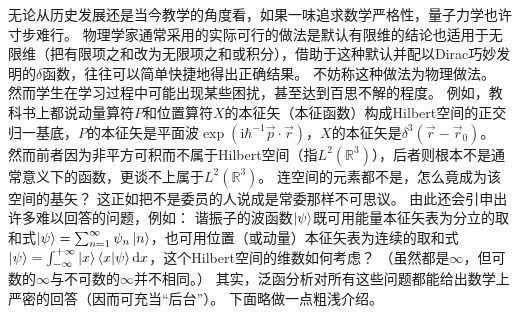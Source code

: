 无论从历史发展还是当今教学的角度看，如果一味追求数学严格性，量子力学也许寸步难行。
物理学家通常采用的实际可行的做法是默认有限维的结论也适用于无限维（把有限项之和改为无限项之和或积分），借助于这种默认并配以Dirac巧妙发明的$\delta$函数，往往可以简单快捷地得出正确结果。
不妨称这种做法为物理做法。
然而学生在学习过程中可能出现某些困扰，甚至达到百思不解的程度。
例如，教科书上都说动量算符$P$和位置算符$X$的本征矢（本征函数）构成Hilbert空间的正交归一基底，$P$的本征矢是平面波$\exp(\mathrm{i}\hbar^{-1}\vec p \cdot \vec r)$，$X$的本征矢是$\delta^3(\vec r - \vec r_0)$。
然而前者因为非平方可积而不属于Hilbert空间（指$L^2(\mathbb{R}^3)$），后者则根本不是通常意义下的函数，更谈不上属于$L^2(\mathbb{R}^3)$。
连空间的元素都不是，怎么竟成为该空间的基矢？
这正如把不是委员的人说成是常委那样不可思议。
由此还会引申出许多难以回答的问题，例如：
谐振子的波函数$\ket{\psi}$既可用能量本征矢表为分立的取和式$\ket{\psi} = \sum^\infty_{n = 1}\psi_n\ket{n}$，也可用位置（或动量）本征矢表为连续的取和式$\ket{\psi} = \int^{+\infty}_{-\infty}\ket{x}\braket{x|\psi}\mathrm{d}x$，这个Hilbert空间的维数如何考虑？
（虽然都是$\infty$，但可数的$\infty$与不可数的$\infty$并不相同。）
其实，泛函分析对所有这些问题都能给出数学上严密的回答（因而可充当``后台''）。
下面略做一点粗浅介绍。

